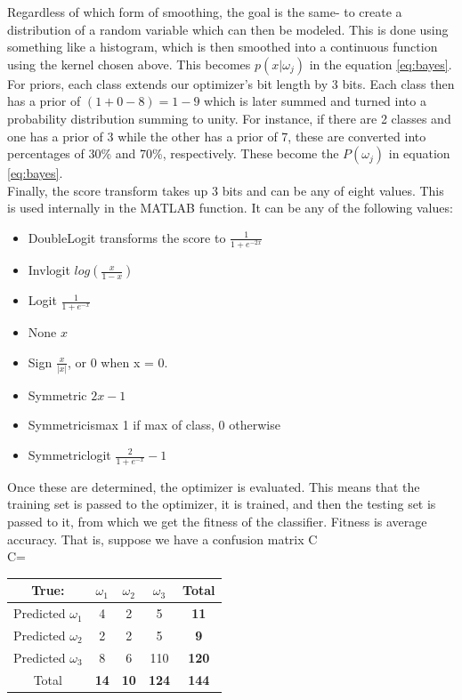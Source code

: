 Regardless of which form of smoothing, the goal is the same- to create a
distribution of a random variable which can then be modeled.  This is done using
something like a histogram, which is then smoothed into a continuous function
using the kernel chosen above.  This becomes $p(x|\omega_j)$ in the equation
\ref{eq:bayes}.\\
For priors, each class extends our optimizer's bit length by 3 bits.  Each class
then has a prior of $(1 + 0-8)= 1-9$ which is later summed and turned into a
probability distribution summing to unity.  For instance, if there are 2 classes
and one has a prior of 3 while the other has a prior of 7, these are converted
into percentages of 30\% and 70\%, respectively.  These become the $P(\omega_j)$
in equation \ref{eq:bayes}.\\
Finally, the score transform takes up 3 bits and can be any of eight values. 
This is used internally in the MATLAB function.  It can be any of the following
values:
\begin{itemize}
	\item DoubleLogit transforms the score to $\frac{1}{1+e^{-2x}}$
	\item Invlogit $log(\frac{x}{1-x})$
	\item Logit $\frac{1}{1+e^{-x}}$
	\item None $x$
	\item Sign $\frac{x}{|x|}$, or 0 when x = 0.
	\item Symmetric $2x-1$
	\item Symmetricismax 1 if max of class, 0 otherwise
	\item Symmetriclogit $\frac{2}{1+e^{-x}}-1$
\end{itemize}
Once these are determined, the optimizer is evaluated.  This means that the training set is passed to the optimizer, it is trained, and then the testing set is passed to it, from which we get the fitness of the classifier.  Fitness is average accuracy.  That is, suppose we have a confusion matrix C\\
C= \begin{tabular}{|c|c|c|c|c|}
	\hline
	True:&$\omega_1$&$\omega_2$&$\omega_3$&\textbf{Total}\\
	\hline
	Predicted $\omega_1$&4&2&5&\textbf{11}\\
	\hline
	Predicted $\omega_2$&2&2&5&\textbf{9}\\
	\hline
	Predicted $\omega_3$&8&6&110&\textbf{120}\\
	\hline
	Total&\textbf{14}&\textbf{10}&\textbf{124}&\textbf{144}\\
	\hline
\end{tabular} 
